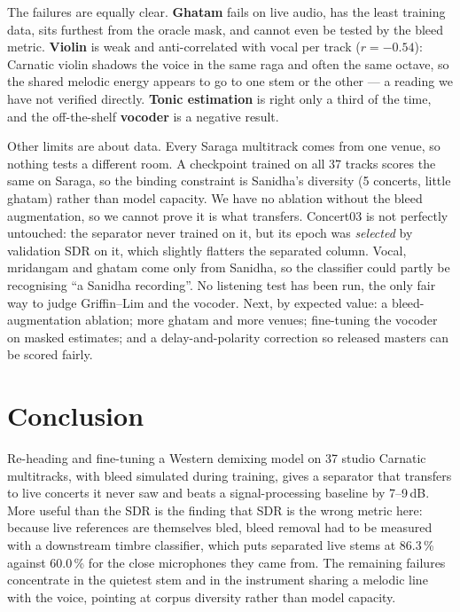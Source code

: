 \documentclass[11pt,a4paper,twocolumn]{article}
\begin{document}
The failures are equally clear. \textbf{Ghatam} fails on live audio, has the least training data,
sits furthest from the oracle mask, and cannot even be tested by the bleed metric. \textbf{Violin}
is weak and anti-correlated with vocal per track ($r=-0.54$): Carnatic violin shadows the voice in
the same raga and often the same octave, so the shared melodic energy appears to go to one stem or
the other --- a reading we have not verified directly. \textbf{Tonic estimation} is right only a
third of the time, and the off-the-shelf \textbf{vocoder} is a negative result.

Other limits are about data. Every Saraga multitrack comes from one venue, so nothing tests a
different room. A checkpoint trained on all 37 tracks scores the same on Saraga, so the binding
constraint is Sanidha's diversity (5 concerts, little ghatam) rather than model capacity. We have
no ablation without the bleed augmentation, so we cannot prove it is what transfers. Concert03 is
not perfectly untouched: the separator never trained on it, but its epoch was \emph{selected} by
validation SDR on it, which slightly flatters the separated column. Vocal, mridangam and ghatam
come only from Sanidha, so the classifier could partly be recognising ``a Sanidha recording''. No
listening test has been run, the only fair way to judge Griffin--Lim and the vocoder. Next, by
expected value: a bleed-augmentation ablation; more ghatam and more venues; fine-tuning the
vocoder on masked estimates; and a delay-and-polarity correction so released masters can be scored
fairly.

\section{Conclusion}
Re-heading and fine-tuning a Western demixing model on 37 studio Carnatic multitracks, with bleed
simulated during training, gives a separator that transfers to live concerts it never saw and beats
a signal-processing baseline by 7--9\,dB. More useful than the SDR is the finding that SDR is the
wrong metric here: because live references are themselves bled, bleed removal had to be measured
with a downstream timbre classifier, which puts separated live stems at 86.3\,\% against 60.0\,\%
for the close microphones they came from. The remaining failures concentrate in the quietest stem
and in the instrument sharing a melodic line with the voice, pointing at corpus diversity rather
than model capacity.
\end{document}
